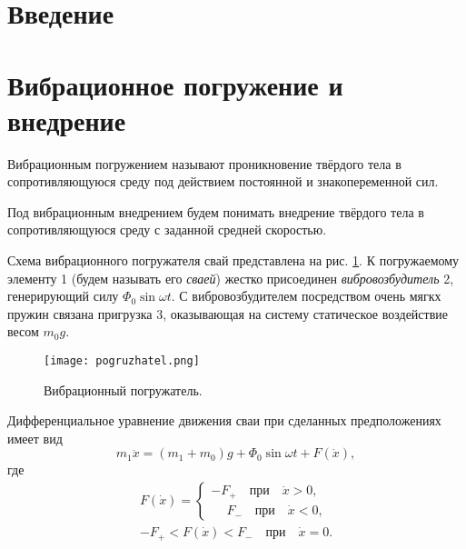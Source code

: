 \section{Введение}

\clearpage

\section{Вибрационное погружение и внедрение}

\begin{definition}
    Вибрационным погружением называют проникновение твёрдого тела в сопротивляющуюся среду
    под действием постоянной и знакопеременной сил.
\end{definition}

\begin{definition}
    Под вибрационным внедрением будем понимать внедрение твёрдого тела в сопротивляющуюся среду с заданной
    средней скоростью.
\end{definition}

Схема вибрационного погружателя свай представлена на рис. \ref{fig:vp}.
К погружаемому элементу 1 (будем называть его \textit{сваей}) жестко присоединен \textit{вибровозбудитель} 2,
генерирующий силу $\Phi_0 \sin \omega t$. С вибровозбудителем посредством очень мягкх пружин связана пригрузка 3,
оказывающая на систему статическое воздействие весом $m_0g$.

\begin{figure}[h]
    \centering
    \texttt{[image: pogruzhatel.png]}
    \caption{Вибрационный погружатель.}
    \label{fig:vp}
\end{figure}

Дифференциальное уравнение движения сваи при сделанных предположениях имеет вид
\begin{equation}
    m_1\ddot{x} = (m_1 + m_0)g + \Phi_0 \sin \omega t + F(\dot{x}),
\end{equation}
где
\begin{equation}
    \begin{aligned}
        F(\dot{x}) =
        \begin{cases}
            -F_+ \quad \text{при} \quad \dot{x} > 0,\\
            \phantom{-}F_- \quad \text{при} \quad \dot{x} < 0,
        \end{cases}\\
        -F_+ < F(\dot{x}) < F_- \quad \text{при} \quad \dot{x} = 0.
    \end{aligned}
\end{equation}